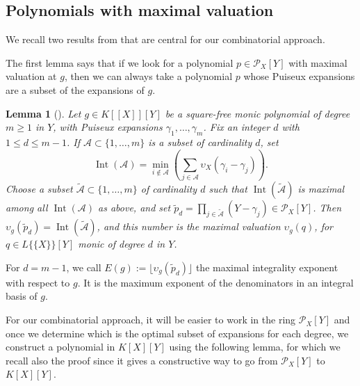 \documentclass[a4paper,11pt]{amsart}%
\theoremstyle{definition}
\theoremstyle{plain}
\newtheorem{lemma}[defn]{Lemma}
\theoremstyle{remark}
\DeclareMathOperator{\Int}{Int}
\begin{document}
\subsection{Polynomials with maximal valuation}
We recall two results from \cite{intbas} that are central for our combinatorial approach.

The first lemma says that if we look for a polynomial $p \in {\mathcal{P}_{X}}[Y]$ with maximal valuation at $g$, then we can always take a polynomial $p$ whose Puiseux expansions are a subset of the expansions of $g$.

\begin{lemma}[{\cite[Lemma 21]{intbas}}]
\label{lemma:intA} Let $g\in K[[X]][Y]$ be a square-free monic polynomial of degree
$m\geq 1$ in $Y$, with Puiseux expansions $\gamma_{1}, \dots, \gamma_{m}$. Fix
an integer $d$ with $1\leq d \leq m-1$. If $\mathcal{A}\subset\{1,\dots,m\}$ is
a subset of cardinality $d$, set
\[
\Int({\mathcal{A}})=\min_{i\not \in \mathcal{A}}\left(  \sum_{j\in\mathcal{A}%
}\upsilon_X(\gamma_{i}-\gamma_{j})\right).
\]
Choose a subset $\widetilde{\mathcal{A}}\subset\{1,\dots,m\}$ of cardinality
$d$ such that $\Int({\widetilde{\mathcal{A}}})$ is maximal among all
$\Int({\mathcal{A}})$ as above, and set $\widetilde{p}_d=\prod_{j\in
\widetilde{\mathcal{A}}}(Y-\gamma_{j})\in{\mathcal{P}_{X}}[Y]$. Then
$\upsilon_{g}(\widetilde{p}_d)=\Int({\widetilde{\mathcal{A}}})$, and this number is the
maximal valuation $\upsilon_{g}(q)$, for
$q\in L\{\{X\}\}[Y]$ monic of degree $d$ in $Y$.
\end{lemma}

For $d = m - 1$, we call $E(g):=\lfloor \upsilon_{g}(\widetilde{p}_d) \rfloor$ the maximal integrality exponent with respect to $g$. It is the maximum exponent of the denominators in an integral basis of $g$.

For our combinatorial approach, it will be easier to work in the ring $\mathcal{P}_{X}[Y]$ and once we determine which is the optimal subset of expansions for each degree, we construct a polynomial in $K[X][Y]$ using the following lemma, for which we recall also the proof since it gives a constructive way to go from $\mathcal{P}_{X}[Y]$  to $K[X][Y]$.
\end{document}

